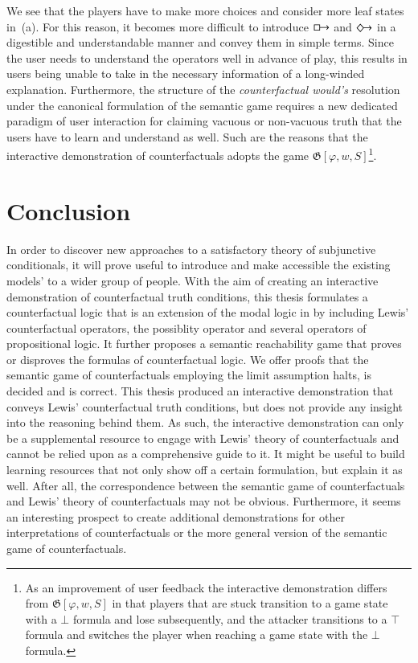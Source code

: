 \documentclass[a4paper,american,10pt]{paper}
\theoremstyle{definition}\newtheorem{definition}{Definition}
\begin{document}
We see that the players have to make more choices and consider more leaf states in~(a). For this reason, it becomes more difficult to introduce $\boxright$ and $\Diamondright$ in a digestible and understandable manner and convey them in simple terms. Since the user needs to understand the operators well in advance of play, this results in users being unable to take in the necessary information of a long-winded explanation. Furthermore, the structure of the \textit{counterfactual would's} resolution under the canonical formulation of the semantic game requires a new dedicated paradigm of user interaction for claiming vacuous or non-vacuous truth that the users have to learn and understand as well. Such are the reasons that the interactive demonstration of counterfactuals adopts the game $\mathfrak{G}[\varphi ,w,S]$\footnote{As an improvement of user feedback the interactive demonstration differs from $\mathfrak{G}[\varphi ,w,S]$ in that players that are stuck transition to a game state with a $\bot$ formula and lose subsequently, and the attacker transitions to a $\top$ formula and switches the player when reaching a game state with the $\bot$ formula.}.
\newpage
\section{Conclusion}\label{sec:end}
In order to discover new approaches to a satisfactory theory of subjunctive conditionals, it will prove useful to introduce and make accessible the existing models' to a wider group of people. With the aim of creating an interactive demonstration of counterfactual truth conditions, this thesis formulates a counterfactual logic that is an extension of the modal logic in \cite{kripke_modal_logic_1963} by including Lewis' counterfactual operators, the possiblity operator and several operators of propositional logic. It further proposes a semantic reachability game that proves or disproves the formulas of counterfactual logic. We offer proofs that the semantic game of counterfactuals employing the limit assumption halts, is decided and is correct. This thesis produced an interactive demonstration that conveys Lewis' counterfactual truth conditions, but does not provide any insight into the reasoning behind them. As such, the interactive demonstration can only be a supplemental resource to engage with Lewis' theory of counterfactuals and cannot be relied upon as a comprehensive guide to it. It might be useful to build learning resources that not only show off a certain formulation, but explain it as well. After all, the correspondence between the semantic game of counterfactuals and Lewis' theory of counterfactuals may not be obvious.
Furthermore, it seems an interesting prospect to create additional demonstrations for other interpretations of counterfactuals or the more general version of the semantic game of counterfactuals.

\nocite{*}

\end{document}
